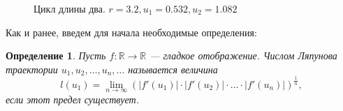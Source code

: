 \documentclass[10pt]{article}
\newtheorem{definition}{Определение}
\numberwithin{equation}{section}
\begin{document}
\begin{figure}[h]
    \centering
    \qquad
    \caption{Цикл длины два. \(  r = 3.2, u_1 = 0.532, u_2 = 1.082 \) }
\end{figure}
	
Как и ранее, введем для начала необходимые определения:
\begin{definition}
	Пусть \( f : \mathbb{R} \to \mathbb{R} \) --- гладкое отображение. Числом Ляпунова траектории \( u_1, u_2, \dots, u_n, \dots \)  называется величина
	\[ l(u_1) = \lim\limits_{n \to \infty} (|f'(u_1)| \cdot |f'(u_2)| \cdot \dots \cdot |f'(u_n)|)^{\frac{1}{n}}, \]
	если этот предел существует.
\end{definition}
\end{document}
